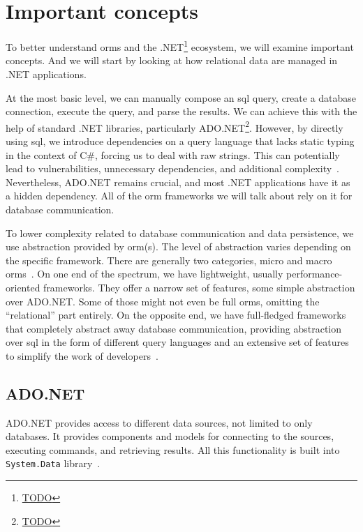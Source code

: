 \section{Important concepts}
To better understand \acrshort{orm}s and the .NET\footnote{\url{TODO}} ecosystem, we will examine important concepts. And we will start by looking at how relational data are managed in .NET applications. 

At the most basic level, we can manually compose an \acrshort{sql} query, create a database connection, execute the query, and parse the results. We can achieve this with the help of standard .NET libraries, particularly ADO.NET\footnote{\url{TODO}}. However, by directly using \acrshort{sql}, we introduce dependencies on a query language that lacks static typing in the context of C\#, forcing us to deal with raw strings. This can potentially lead to vulnerabilities, unnecessary dependencies, and additional complexity~\cite{TODO}. Nevertheless, ADO.NET remains crucial, and most .NET applications have it as a hidden dependency. All of the \acrshort{orm} frameworks we will talk about rely on it for database communication. 

To lower complexity related to database communication and data persistence, we use abstraction provided by \acrshort{orm}(s).
The level of abstraction varies depending on the specific framework. There are generally two categories, micro and macro \acrshort{orm}s~\cite{TODO}. On one end of the spectrum, we have lightweight, usually performance-oriented frameworks. They offer a narrow set of features, some simple abstraction over ADO.NET. Some of those might not even be full \acrshort{orm}s, omitting the ``relational'' part entirely. On the opposite end, we have full-fledged frameworks that completely abstract away database communication, providing abstraction over \acrshort{sql} in the form of different query languages and an extensive set of features to simplify the work of developers~\cite{Dapper}.

\subsection{ADO.NET}
ADO.NET provides access to different data sources, not limited to only databases. It provides components and models for connecting to the sources, executing commands, and retrieving results. All this functionality is built into \texttt{System.Data} library~\cite{ADONET}.

